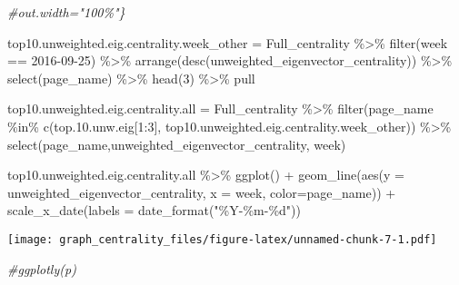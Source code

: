 \documentclass[
]{article}
\newenvironment{Shaded}{\begin{snugshade}}{\end{snugshade}}
\newcommand{\AttributeTok}[1]{\textcolor[rgb]{0.77,0.63,0.00}{#1}}
\newcommand{\CommentTok}[1]{\textcolor[rgb]{0.56,0.35,0.01}{\textit{#1}}}
\newcommand{\DecValTok}[1]{\textcolor[rgb]{0.00,0.00,0.81}{#1}}
\newcommand{\FloatTok}[1]{\textcolor[rgb]{0.00,0.00,0.81}{#1}}
\newcommand{\FunctionTok}[1]{\textcolor[rgb]{0.00,0.00,0.00}{#1}}
\newcommand{\NormalTok}[1]{#1}
\newcommand{\OtherTok}[1]{\textcolor[rgb]{0.56,0.35,0.01}{#1}}
\newcommand{\SpecialCharTok}[1]{\textcolor[rgb]{0.00,0.00,0.00}{#1}}
\newcommand{\StringTok}[1]{\textcolor[rgb]{0.31,0.60,0.02}{#1}}
\begin{document}
\begin{Shaded}
\begin{Highlighting}[]
\CommentTok{\#out.width="100\%"\}}

\NormalTok{top10.unweighted.eig.centrality.week\_other }\OtherTok{=}\NormalTok{ Full\_centrality }\SpecialCharTok{\%\textgreater{}\%} \FunctionTok{filter}\NormalTok{(week }\SpecialCharTok{==} \StringTok{\textquotesingle{}2016{-}09{-}25\textquotesingle{}}\NormalTok{) }\SpecialCharTok{\%\textgreater{}\%} \FunctionTok{arrange}\NormalTok{(}\FunctionTok{desc}\NormalTok{(unweighted\_eigenvector\_centrality)) }\SpecialCharTok{\%\textgreater{}\%} \FunctionTok{select}\NormalTok{(page\_name) }\SpecialCharTok{\%\textgreater{}\%} \FunctionTok{head}\NormalTok{(}\DecValTok{3}\NormalTok{) }\SpecialCharTok{\%\textgreater{}\%}\NormalTok{ pull}


\NormalTok{top10.unweighted.eig.centrality.all }\OtherTok{=}\NormalTok{ Full\_centrality }\SpecialCharTok{\%\textgreater{}\%} \FunctionTok{filter}\NormalTok{(page\_name }\SpecialCharTok{\%in\%} \FunctionTok{c}\NormalTok{(top.}\FloatTok{10.}\NormalTok{unw.eig[}\DecValTok{1}\SpecialCharTok{:}\DecValTok{3}\NormalTok{], top10.unweighted.eig.centrality.week\_other)) }\SpecialCharTok{\%\textgreater{}\%} \FunctionTok{select}\NormalTok{(page\_name,unweighted\_eigenvector\_centrality, week)}


\NormalTok{top10.unweighted.eig.centrality.all }\SpecialCharTok{\%\textgreater{}\%} \FunctionTok{ggplot}\NormalTok{() }\SpecialCharTok{+} 
  \FunctionTok{geom\_line}\NormalTok{(}\FunctionTok{aes}\NormalTok{(}\AttributeTok{y =}\NormalTok{ unweighted\_eigenvector\_centrality, }\AttributeTok{x =}\NormalTok{ week, }\AttributeTok{color=}\NormalTok{page\_name)) }\SpecialCharTok{+}
  \FunctionTok{scale\_x\_date}\NormalTok{(}\AttributeTok{labels =} \FunctionTok{date\_format}\NormalTok{(}\StringTok{"\%Y{-}\%m{-}\%d"}\NormalTok{))}
\end{Highlighting}
\end{Shaded}

\texttt{[image: graph\_centrality\_files/figure-latex/unnamed-chunk-7-1.pdf]}

\begin{Shaded}
\begin{Highlighting}[]
\CommentTok{\#ggplotly(p)}
\end{Highlighting}
\end{Shaded}
\end{document}
